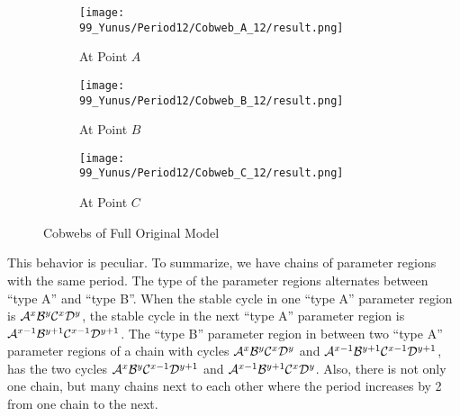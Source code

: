 \begin{figure}
	\centering
	\begin{subfigure}{0.3\textwidth}
		\centering
		\texttt{[image: 99\_Yunus/Period12/Cobweb\_A\_12/result.png]}
		\caption{At Point $A$}
		\label{fig:yunus.2pi.CobwebA12}
	\end{subfigure}
	\begin{subfigure}{0.3\textwidth}
		\centering
		\texttt{[image: 99\_Yunus/Period12/Cobweb\_B\_12/result.png]}
		\caption{At Point $B$}
		\label{fig:yunus.2pi.CobwebB12}
	\end{subfigure}
	\begin{subfigure}{0.3\textwidth}
		\centering
		\texttt{[image: 99\_Yunus/Period12/Cobweb\_C\_12/result.png]}
		\caption{At Point $C$}
		\label{fig:yunus.2pi.CobwebC12}
	\end{subfigure}
	\caption{Cobwebs of Full Original Model}
\end{figure}

This behavior is peculiar.
To summarize, we have chains of parameter regions with the same period.
The type of the parameter regions alternates between ``type A'' and ``type B''.
When the stable cycle in one ``type A'' parameter region is $\mathcal{A}^x\mathcal{B}^y\mathcal{C}^x\mathcal{D}^y$, the stable cycle in the next ``type A'' parameter region is $\mathcal{A}^{x-1}\mathcal{B}^{y+1}\mathcal{C}^{x-1}\mathcal{D}^{y+1}$.
The ``type B'' parameter region in between two ``type A'' parameter regions of a chain with cycles $\mathcal{A}^x\mathcal{B}^y\mathcal{C}^x\mathcal{D}^y$ and $\mathcal{A}^{x-1}\mathcal{B}^{y+1}\mathcal{C}^{x-1}\mathcal{D}^{y+1}$, has the two cycles $\mathcal{A}^x\mathcal{B}^y\mathcal{C}^{x-1}\mathcal{D}^{y+1}$ and $\mathcal{A}^{x-1}\mathcal{B}^{y+1}\mathcal{C}^x\mathcal{D}^y$.
Also, there is not only one chain, but many chains next to each other where the period increases by 2 from one chain to the next.
